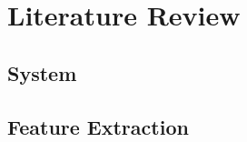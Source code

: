 %
\chapter{Literature Review}
\label{sec:review}


\blindtext

\section{System}
\label{sec:review:sys}

\blindtext

\section{Feature Extraction}
\label{sec:review:feature}

\blindtext
